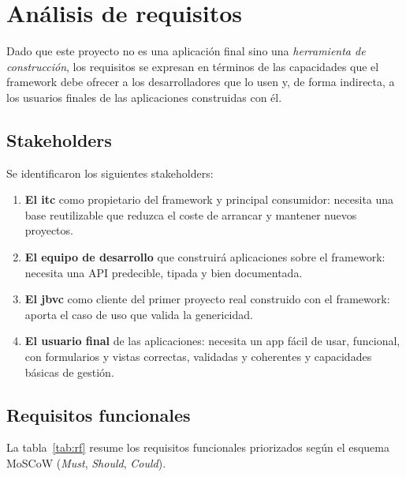 \chapter{Análisis de requisitos}

Dado que este proyecto no es una aplicación final sino una \emph{herramienta de
construcción}, los requisitos se expresan en términos de las capacidades que
el framework debe ofrecer a los desarrolladores que lo usen y, de forma
indirecta, a los usuarios finales de las aplicaciones construidas con él.

\section{Stakeholders}
Se identificaron los siguientes \gls{stakeholders}:

\begin{enumerate}
  \item \textbf{El \gls{itc}} como propietario del framework y principal
  consumidor: necesita una base reutilizable que reduzca el coste de arrancar
  y mantener nuevos proyectos.
  \item \textbf{El equipo de desarrollo} que construirá aplicaciones sobre el
  framework: necesita una API predecible, tipada y bien documentada.
  \item \textbf{El \gls{jbvc}} como cliente del primer proyecto real
  construido con el framework: aporta el caso de uso que valida la genericidad.
  \item \textbf{El usuario final} de las aplicaciones: necesita un app fácil de usar,
  funcional, con formularios y vistas correctas, validadas y coherentes y capacidades básicas de gestión.
\end{enumerate}

\section{Requisitos funcionales}
La tabla~\ref{tab:rf} resume los requisitos funcionales priorizados según el
esquema MoSCoW (\emph{Must}, \emph{Should}, \emph{Could}).

